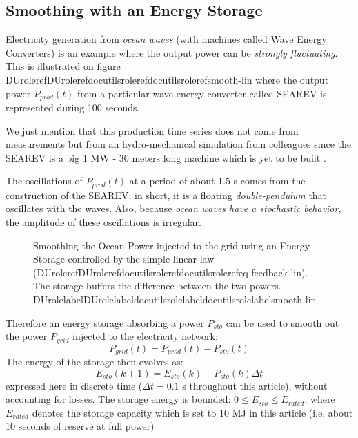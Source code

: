 \documentclass[letterpaper,compsoc,twoside]{IEEEtran}
\providecommand*{\DUrole}[2]{\ifcsname DUrole#1\endcsname \csname DUrole#1\endcsname{#2}\else \ifcsname docutilsrole#1\endcsname \csname docutilsrole#1\endcsname{#2}\else #2\fi \fi }
\begin{document}
\subsection{Smoothing with an Energy Storage\label{smoothing-with-an-energy-storage}}


Electricity generation from \emph{ocean waves} (with machines called Wave
Energy Converters) is an example where the output power can be \emph{strongly
fluctuating}. This is illustrated on figure \DUrole{ref}{smooth-lin}
where the output power $P_{prod}(t)$ from a particular wave energy
converter called SEAREV is represented during 100 seconds.

We just mention that this production time series does not come from
measurements but from an hydro-mechanical simulation from colleagues
since the SEAREV is a big 1 MW - 30 meters long machine which is yet to be
built \cite{Ruellan-2010}.

The oscillations of $P_{prod}(t)$ at a period of about 1.5 s comes
from the construction of the SEAREV: in short, it is a floating
\emph{double-pendulum} that oscillates with the waves. Also, because \emph{ocean
waves have a stochastic behavior}, the amplitude of these oscillations
is irregular.\begin{figure}[]\noindent{}
\caption{Smoothing the Ocean Power injected to the grid using an Energy Storage
controlled by the simple linear law (\DUrole{ref}{eq-feedback-lin}).
The storage buffers the difference between the two powers.
\DUrole{label}{smooth-lin}}
\end{figure}

Therefore an energy storage absorbing a power $P_{sto}$ can be
used to smooth out the power $P_{grid}$ injected to the
electricity network:\begin{equation}
\label{eq-P-grid}
 P_{grid}(t) = P_{prod}(t) - P_{sto}(t)
\end{equation}The energy of the storage then evolves as:\begin{equation}
\label{eq-E-sto}
 E_{sto}(k+1) = E_{sto}(k) + P_{sto}(k)\Delta t
\end{equation}expressed here in discrete time ($\Delta t = 0.1 \text{ s}$
throughout this article), without accounting for losses. The storage
energy is bounded: $0 \leq E_{sto} \leq E_{rated}$, where
$E_{rated}$ denotes the storage capacity which is set to 10 MJ in
this article (i.e. about 10 seconds of reserve at full power)
\end{document}
